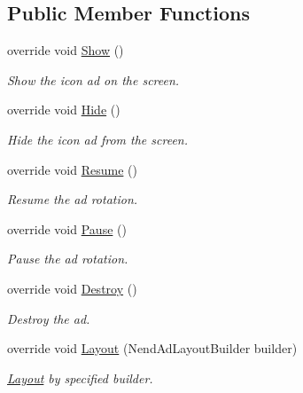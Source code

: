 \subsection*{Public Member Functions}
\begin{DoxyCompactItemize}
\item 
override void \hyperlink{class_nend_unity_plugin_1_1_a_d_1_1_nend_ad_icon_a8e7741b7f1a54cdb75eba5fda4d12540}{Show} ()
\begin{DoxyCompactList}\small\item\em Show the icon ad on the screen. \end{DoxyCompactList}\item 
override void \hyperlink{class_nend_unity_plugin_1_1_a_d_1_1_nend_ad_icon_adcb0205927da4de63640a9fbcfada4f5}{Hide} ()
\begin{DoxyCompactList}\small\item\em Hide the icon ad from the screen. \end{DoxyCompactList}\item 
override void \hyperlink{class_nend_unity_plugin_1_1_a_d_1_1_nend_ad_icon_a384600c7454a8a199469e64df7171917}{Resume} ()
\begin{DoxyCompactList}\small\item\em Resume the ad rotation. \end{DoxyCompactList}\item 
override void \hyperlink{class_nend_unity_plugin_1_1_a_d_1_1_nend_ad_icon_aadae47832b19c160783df7c60d3e6fbe}{Pause} ()
\begin{DoxyCompactList}\small\item\em Pause the ad rotation. \end{DoxyCompactList}\item 
override void \hyperlink{class_nend_unity_plugin_1_1_a_d_1_1_nend_ad_icon_aa60885f6d416492924fa722cce287d16}{Destroy} ()
\begin{DoxyCompactList}\small\item\em Destroy the ad. \end{DoxyCompactList}\item 
override void \hyperlink{class_nend_unity_plugin_1_1_a_d_1_1_nend_ad_icon_a1e33301a9278e10570a5e0aa3472ce08}{Layout} (Nend\+Ad\+Layout\+Builder builder)
\begin{DoxyCompactList}\small\item\em \hyperlink{namespace_nend_unity_plugin_1_1_layout}{Layout} by specified builder. \end{DoxyCompactList}\end{DoxyCompactItemize}
